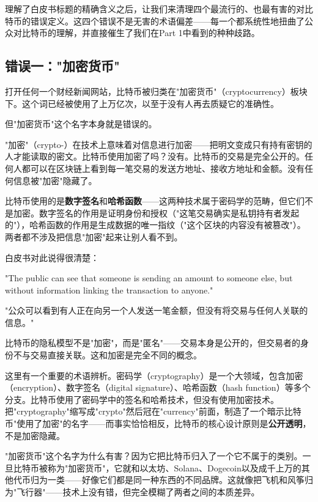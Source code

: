 \documentclass[a4paper,12pt,openany]{ctexbook}
\newenvironment{quoting}{%
  \par\vspace{0.5em}%
  \begin{list}{}{%
    \setlength{\leftmargin}{2em}%
    \setlength{\rightmargin}{2em}%
    \setlength{\parsep}{0.3em}%
    \setlength{\itemsep}{0pt}%
    \setlength{\topsep}{0pt}%
  }%
  \item\relax
}{%
  \end{list}%
  \par\vspace{0.5em}%
}
\begin{document}
理解了白皮书标题的精确含义之后，让我们来清理四个最流行的、也最有害的对比特币的错误定义。这四个错误不是无害的术语偏差——每一个都系统性地扭曲了公众对比特币的理解，并直接催生了我们在Part 1中看到的种种歧路。


\subsection*{错误一："加密货币"}


打开任何一个财经新闻网站，比特币被归类在"加密货币"（cryptocurrency）板块下。这个词已经被使用了上万亿次，以至于没有人再去质疑它的准确性。

但"加密货币"这个名字本身就是错误的。

"加密"（crypto-）在技术上意味着对信息进行加密——把明文变成只有持有密钥的人才能读取的密文。比特币使用加密了吗？没有。比特币的交易是完全公开的。任何人都可以在区块链上看到每一笔交易的发送方地址、接收方地址和金额。没有任何信息被"加密"隐藏了。

比特币使用的是\textbf{数字签名}和\textbf{哈希函数}——这两种技术属于密码学的范畴，但它们不是加密。数字签名的作用是证明身份和授权（"这笔交易确实是私钥持有者发起的"），哈希函数的作用是生成数据的唯一指纹（"这个区块的内容没有被篡改"）。两者都不涉及把信息"加密"起来让别人看不到。

白皮书对此说得很清楚：


\begin{quoting}
\small
"The public can see that someone is sending an amount to someone else, but without information linking the transaction to anyone."

"公众可以看到有人正在向另一个人发送一笔金额，但没有将交易与任何人关联的信息。"
\end{quoting}


比特币的隐私模型不是"加密"，而是"匿名"——交易本身是公开的，但交易者的身份不与交易直接关联。这和加密是完全不同的概念。

这里有一个重要的术语辨析。密码学（cryptography）是一个大领域，包含加密（encryption）、数字签名（digital signature）、哈希函数（hash function）等多个分支。比特币使用了密码学中的签名和哈希技术，但没有使用加密技术。把"cryptography"缩写成"crypto"然后冠在"currency"前面，制造了一个暗示比特币"使用了加密"的名字——而事实恰恰相反，比特币的核心设计原则是\textbf{公开透明}，不是加密隐藏。

"加密货币"这个名字为什么有害？因为它把比特币归入了一个它不属于的类别。一旦比特币被称为"加密货币"，它就和以太坊、Solana、Dogecoin以及成千上万的其他代币归为一类——好像它们都是同一种东西的不同品牌。这就像把飞机和风筝归为"飞行器"——技术上没有错，但完全模糊了两者之间的本质差异。
\end{document}

